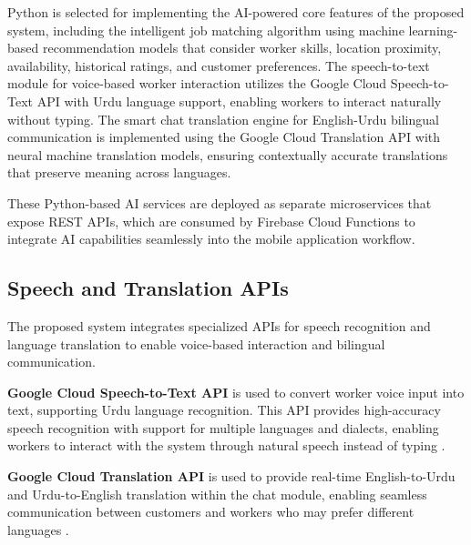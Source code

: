 \documentclass[12pt,a4paper]{report}
\begin{document}
Python is selected for implementing the AI-powered core features of the proposed
system, including the intelligent job matching algorithm using machine
learning-based recommendation models that consider worker skills, location
proximity, availability, historical ratings, and customer preferences. The
speech-to-text module for voice-based worker interaction utilizes the Google
Cloud Speech-to-Text API with Urdu language support, enabling workers to
interact naturally without typing. The smart chat translation engine for
English-Urdu bilingual communication is implemented using the Google Cloud
Translation API with neural machine translation models, ensuring contextually
accurate translations that preserve meaning across languages.

These Python-based AI services are deployed as separate microservices that
expose REST APIs, which are consumed by Firebase Cloud Functions to integrate
AI capabilities seamlessly into the mobile application workflow.

\subsection{Speech and Translation APIs}
The proposed system integrates specialized APIs for speech recognition and
language translation to enable voice-based interaction and bilingual
communication.

\textbf{Google Cloud Speech-to-Text API} is used to convert worker voice input
into text, supporting Urdu language recognition. This API provides high-accuracy
speech recognition with support for multiple languages and dialects, enabling
workers to interact with the system through natural speech instead of typing
\cite{google_speech}.

\textbf{Google Cloud Translation API} is used to provide real-time
English-to-Urdu and Urdu-to-English translation within the chat module, enabling
seamless communication between customers and workers who may prefer different
languages \cite{google_translation}.
\end{document}
